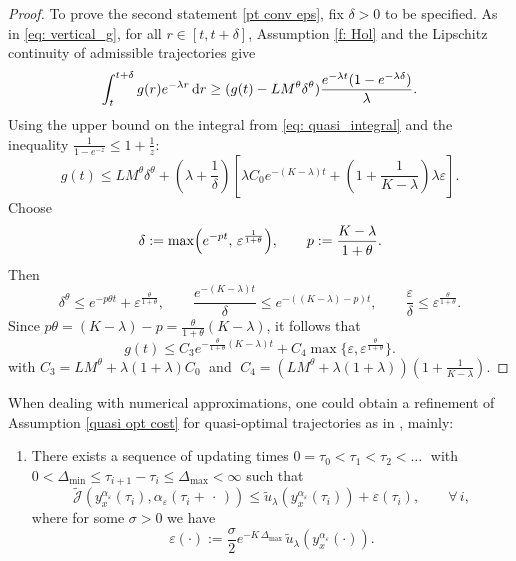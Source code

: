 \documentclass[12pt]{amsart}
\newcommand{\D}[1]{\mbox{\rm #1}}
\newcommand{\dd}{\D{d}}
\numberwithin{equation}{section}
\theoremstyle{plain}
\begin{document}
\begin{proof}
To prove the second statement \ref{pt conv eps}, fix $\delta > 0$ to be specified. As in \eqref{eq: vertical_g}, for all $r \in [t, t+\delta]$, Assumption \ref{f: Hol} and the Lipschitz continuity of admissible  trajectories give
\begin{equation*}
\int_t^{t+\delta} g(r) e^{-\lambda r} \,\dd r \ge (g(t) - L M^\theta \delta^\theta) \frac{e^{-\lambda t}(1 - e^{-\lambda \delta})}{\lambda}.
\end{equation*}
Using the upper bound on the integral from \eqref{eq: quasi_integral} and the inequality $\frac{1}{1-e^{-z}} \le 1 + \frac{1}{z}$:
\begin{equation*}
g(t) \le L M^\theta \delta^\theta + \left( \lambda + \frac{1}{\delta} \right) \left[ \lambda C_0 e^{-(K-\lambda)t} + (1+ \frac{1}{K-\lambda})\lambda \varepsilon \right].
\end{equation*}
Choose
\begin{equation*}
\delta:=\max\Bigl(e^{-pt},\,\varepsilon^{\frac{1}{1+\theta}}\Bigr),
\qquad
p:=\frac{K-\lambda}{1+\theta}.
\end{equation*}
Then
\begin{equation*}
\delta^\theta \le e^{-p\theta t}+\varepsilon^{\frac{\theta}{1+\theta}},
\qquad
\frac{e^{-(K-\lambda)t}}{\delta}\le e^{-((K-\lambda)-p)t},
\qquad
\frac{\varepsilon}{\delta}\le \varepsilon^{\frac{\theta}{1+\theta}}.
\end{equation*}
Since $p\theta=(K-\lambda)-p=\frac{\theta}{1+\theta}(K-\lambda)$, it follows that
\begin{equation*}
g(t)\le C_3 e^{-\frac{\theta}{1+\theta}(K-\lambda)t}
   + C_4\max\{\varepsilon,\varepsilon^{\frac{\theta}{1+\theta}}\}.
\end{equation*}
with $C_3=L M^\theta+\lambda(1+\lambda) C_0\;$ and $\;C_4=\left(L M^\theta+\lambda(1+\lambda)\right)(1+ \frac{1}{K-\lambda}) .$
\end{proof}

When dealing with numerical approximations, one could obtain a refinement of Assumption \ref{quasi opt cost} for quasi-optimal trajectories as in \cite[Assumption 3.4]{gaitsgory2015stabilization}, mainly: 


\begin{enumerate}[label=\textbf{($\text{C}_{\Delta}$)}]
    \item\label{quasi opt cost delta} 
    There exists a sequence of updating times $0=\tau_{0}<\tau_{1}<\tau_{2}<\dots\;$ with $0< \Delta_{\min}\leq \tau_{i+1} - \tau_{i}\leq \Delta_{\max}<\infty$
    such that
    \begin{equation*}
       \widetilde{\mathscr{J}}(y_{x}^{\alpha_{\varepsilon}}(\tau_{i}),\alpha_{\varepsilon}(\tau_{i}+\,\cdot\,)) \leq \tilde{u}_{\lambda}(y_{x}^{\alpha_{\varepsilon}}(\tau_{i})) + \varepsilon(\tau_{i}), \quad \quad \forall\,i,
    \end{equation*} 
    where for some $\sigma>0$ we have
    \begin{equation*}
        \varepsilon(\cdot) := \frac{\sigma}{2}e^{-K\,\Delta_{\max}}\,\tilde{u}_{\lambda}(y_{x}^{\alpha_{\varepsilon}}(\cdot)).
    \end{equation*}
\end{enumerate}
\end{document}
